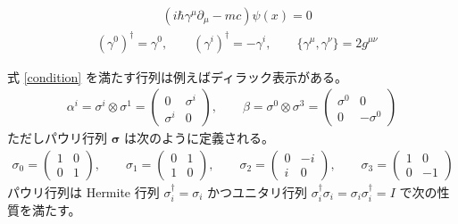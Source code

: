 \documentclass[uplatex,dvipdfmx,a4paper,11pt]{jlreq}
\numberwithin{equation}{section}
\theoremstyle{definition}
\begin{document}
\begin{definition}[ディラック方程式]
  \begin{align}
     & (i\hbar\gamma^\mu \partial_\mu - mc)\psi(x) = 0
  \end{align}
  \begin{align}
     & (\gamma^0)^\dagger = \gamma^0, \qquad (\gamma^i)^\dagger = -\gamma^i, \qquad \lbrace\gamma^\mu, \gamma^\nu\rbrace = 2g^{\mu\nu}
  \end{align}
\end{definition}
式 \eqref{condition} を満たす行列は例えばディラック表示がある。
\begin{align}
  \alpha^i = \sigma^i \otimes \sigma^1 = \begin{pmatrix}
                                           0        & \sigma^i \\
                                           \sigma^i & 0
                                         \end{pmatrix}, \qquad
  \beta = \sigma^0 \otimes \sigma^3 = \begin{pmatrix}
                                        \sigma^0 & 0         \\
                                        0        & -\sigma^0
                                      \end{pmatrix}
\end{align}
ただしパウリ行列 $\bm{\sigma}$ は次のように定義される。
\begin{align}
  \sigma_0 = \begin{pmatrix}
               1 & 0 \\
               0 & 1
             \end{pmatrix}, \qquad
  \sigma_1 = \begin{pmatrix}
               0 & 1 \\
               1 & 0
             \end{pmatrix}, \qquad
  \sigma_2 = \begin{pmatrix}
               0 & -i \\
               i & 0
             \end{pmatrix}, \qquad
  \sigma_3 = \begin{pmatrix}
               1 & 0  \\
               0 & -1
             \end{pmatrix}
\end{align}
パウリ行列は Hermite 行列 $\sigma_i^\dagger = \sigma_i$ かつユニタリ行列 $\sigma_i^\dagger\sigma_i = \sigma_i\sigma_i^\dagger = I$ で次の性質を満たす。
\end{document}
